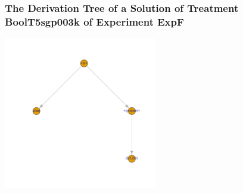  \begin{frame}
 \frametitle{ The Derivation Tree of a Solution of Treatment BoolT5sgp003k of Experiment ExpF }
 \begin{center}
\includegraphics[width=0.5\textwidth, angle=0]
{ExpFDerivationTreeFigure001.pdf}
 \end{center}
 \label{templateReport/ExpFDerivationTreeFigure001.pdf}  
 \end{frame}

